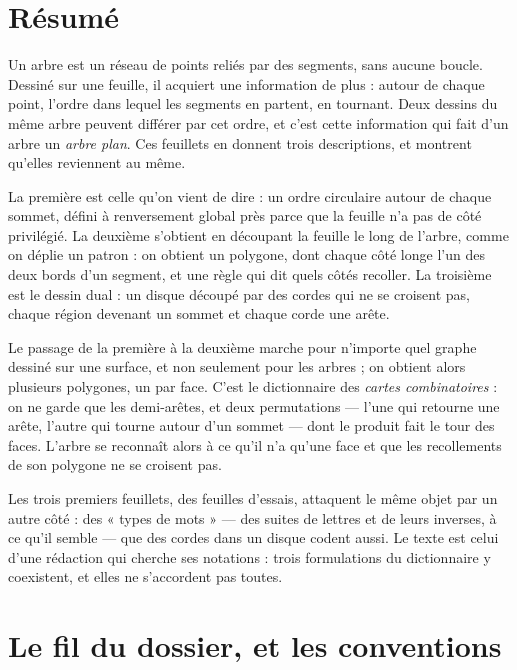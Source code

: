 \documentclass[11pt,a4paper]{article}
\begin{document}
\section*{Résumé}

\begin{resume}
Un arbre est un réseau de points reliés par des segments, sans aucune boucle.
Dessiné sur une feuille, il acquiert une information de plus : autour de chaque
point, l'ordre dans lequel les segments en partent, en tournant. Deux dessins
du même arbre peuvent différer par cet ordre, et c'est cette information qui
fait d'un arbre un \emph{arbre plan}. Ces feuillets en donnent trois
descriptions, et montrent qu'elles reviennent au même.

La première est celle qu'on vient de dire : un ordre circulaire autour de chaque
sommet, défini à renversement global près parce que la feuille n'a pas de
côté privilégié. La deuxième s'obtient en découpant la feuille le long de
l'arbre, comme on déplie un patron : on obtient un polygone, dont chaque côté
longe l'un des deux bords d'un segment, et une règle qui dit quels côtés
recoller. La troisième est le dessin dual : un disque découpé par des cordes qui
ne se croisent pas, chaque région devenant un sommet et chaque corde une arête.

Le passage de la première à la deuxième marche pour n'importe quel graphe
dessiné sur une surface, et non seulement pour les arbres ; on obtient alors
plusieurs polygones, un par face. C'est le dictionnaire des \emph{cartes
combinatoires} : on ne garde que les demi-arêtes, et deux permutations --- l'une
qui retourne une arête, l'autre qui tourne autour d'un sommet --- dont le
produit fait le tour des faces. L'arbre se reconnaît alors à ce qu'il n'a
qu'une face et que les recollements de son polygone ne se croisent pas.

Les trois premiers feuillets, des feuilles d'essais, attaquent le même objet
par un autre côté : des « types de mots » --- des suites de lettres et de leurs
inverses, à ce qu'il semble --- que des cordes dans un disque codent aussi. Le texte est celui d'une rédaction qui cherche ses notations : trois
formulations du dictionnaire y coexistent, et elles ne s'accordent pas toutes.

\end{resume}

\section*{Le fil du dossier, et les conventions}
\end{document}

